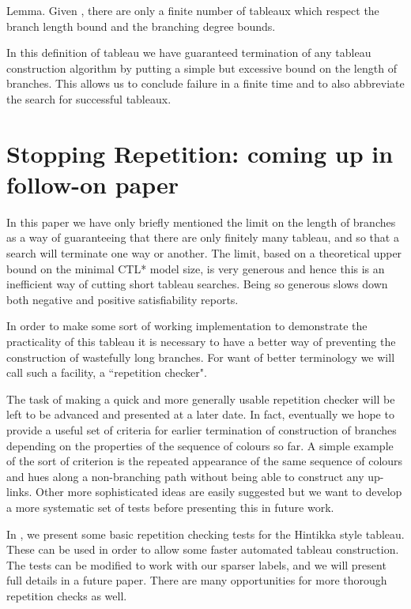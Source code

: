 \documentclass[submission,copyright,creativecommons]{eptcs}
\newenvironment{lemma}{Lemma. }{}
\begin{document}
\begin{lemma}
Given ,
there are only a finite 
number of tableaux 
which respect the branch length bound 
and the branching degree bounds.
\end{lemma}

In this definition of tableau we have guaranteed
termination of any 
tableau construction
algorithm
by putting a simple 
but excessive bound
on the length of branches.
This allows us to 
conclude failure in a finite time
and to also abbreviate the
search for successful tableaux.


\section{Stopping Repetition: coming up in follow-on paper}
\label{sec:stop}

In this paper we have only briefly
mentioned the limit on the length
of branches as a way of guaranteeing that
there are only finitely many tableau,
and so that a search will terminate
one way or another.
The limit,
based on a theoretical upper bound
on the minimal CTL* model size,
is very generous and hence this is an inefficient
way of
cutting short tableau searches.
Being so generous slows down both negative and positive
satisfiability reports.

In order to make some sort of working
implementation to demonstrate the 
practicality of this tableau
it is necessary to have a better way
of preventing the construction
of wastefully long branches.
For want of better terminology
we will call such a facility,
a ``repetition checker".

The task of making a quick
and more generally usable
repetition checker will be left 
to be advanced and presented at a later date.
In fact, eventually we hope to
provide a useful  set of criteria
for earlier termination
of construction of branches
depending on the 
properties of the
sequence of colours
so far.
A simple example
of the sort of criterion 
is the repeated appearance of the same
sequence of colours and hues
along a non-branching path
without being able to construct any
up-links.
Other more sophisticated ideas
are easily suggested
but we want to
develop a more systematic
set of tests 
before presenting this
in future work.

In \cite{Rey:startab}, we
present some basic repetition checking 
tests
for the Hintikka style tableau.
These can be used in order to allow
some faster automated tableau
construction.
The tests can be modified to work with 
our sparser labels,
and we will present full details in a future paper.
There are many opportunities for more thorough 
repetition checks as well.
\end{document}
